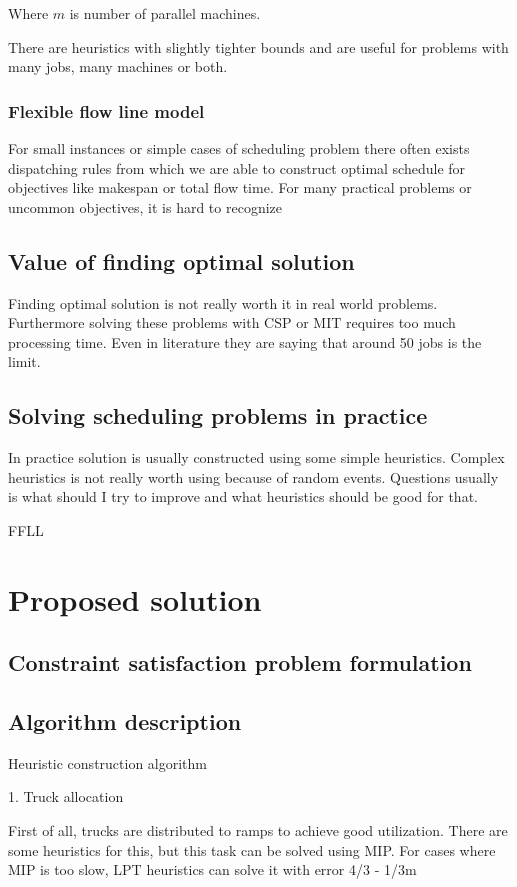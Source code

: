 \documentclass{ctuthesis}
\begin{document}
Where $m$ is number of parallel machines.

There are heuristics with slightly tighter bounds and are useful for problems with many jobs, many machines or both. 

\subsection{Flexible flow line model}

For small instances or simple cases of scheduling problem there often exists dispatching rules from which we are able to construct optimal schedule for objectives like makespan or total flow time. For many practical problems or uncommon objectives, it is hard to recognize 

\section{Value of finding optimal solution}
Finding optimal solution is not really worth it in real world problems. Furthermore solving these problems with CSP or MIT requires too much processing time. Even in literature they are saying that around 50 jobs is the limit. 
\section{Solving scheduling problems in practice}
In practice solution is usually constructed using some simple heuristics. Complex heuristics is not really worth using because of random events. Questions usually is what should I try to improve and what heuristics should be good for that. 

FFLL 
\chapter{Proposed solution}
\label{ch:Proposed solution}
\section{Constraint satisfaction problem formulation}
\section{Algorithm description}
Heuristic construction algorithm

1. Truck allocation

First of all, trucks are distributed to ramps to achieve good utilization. There are some heuristics for this, but this task can be solved using MIP. For cases where MIP is too slow, LPT heuristics can solve it with error 4/3 - 1/3m 
\cite{gram1969}
\end{document}
